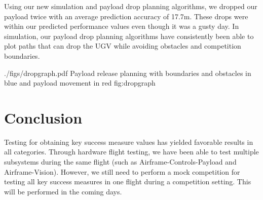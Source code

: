 \documentclass[]{auvsi_doc}
\begin{document}
Using our new simulation and payload drop planning algorithms, we dropped our payload twice with an average
prediction accuracy of 17.7m. These drops were within our predicted performance values even though it was
a gusty day. In simulation, our payload drop planning algorithms have consistently been able to plot paths
that can drop the UGV while avoiding obstacles and competition boundaries.

\AUVSIFigure
{./figs/dropgraph.pdf}
{\textwidth}
{Payload release planning with boundaries and obstacles in blue and payload movement in red}
{fig:dropgraph}

\section{Conclusion}

Testing for obtaining key success measure values has yielded favorable results in all categories. Through hardware flight testing, we have been able to test multiple subsystems during the same flight (such as Airframe-Controls-Payload and Airframe-Vision). However, we still need to perform a mock competition for testing all key success measures in one flight during a competition setting. This will be performed in the coming days.
\end{document}

